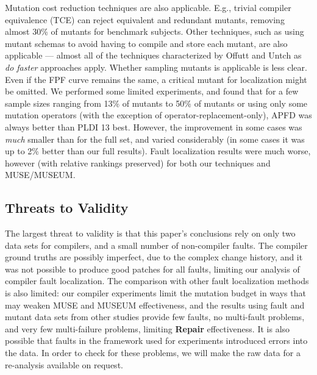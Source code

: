 Mutation cost reduction techniques are also applicable.  E.g., trivial compiler equivalence (TCE) \cite{TCE} can reject equivalent and redundant mutants, removing almost 30\% of mutants for benchmark subjects. Other techniques, such as using mutant schemas to avoid having to compile and store each mutant, are also applicable --- almost all of the techniques characterized by Offutt and Untch \cite{offutt2001mutation} as \emph{do faster} approaches apply.   Whether sampling mutants \cite{RahulISSRE} is applicable is less clear.  Even if the FPF curve remains the same, a critical mutant for localization might be omitted.  We performed some limited experiments, and found that for a few sample sizes ranging from 13\% of mutants to 50\% of mutants or using only some mutation operators (with the exception of operator-replacement-only), APFD was always better than PLDI 13 best.   However, the improvement in some cases was \emph{much} smaller than for the full set, and varied considerably (in some cases it was up to 2\% better than our full results).  Fault localization results were much worse, however (with relative rankings preserved) for both our techniques and MUSE/MUSEUM.  

\subsection{Threats to Validity}

The largest threat to validity is that this paper's conclusions rely on only two data sets for compilers, and a small number of non-compiler faults.  The compiler ground truths are possibly imperfect, due to the complex change history, and it was not possible to produce good patches for all faults, limiting our analysis of compiler fault localization.    The comparison with other fault localization methods is also limited:  our compiler experiments limit the mutation budget in ways that may weaken MUSE and MUSEUM effectiveness, and the results using fault and mutant data sets from other studies provide few faults, no multi-fault problems, and very few multi-failure problems, limiting {\bf Repair} effectiveness.   It is also possible that faults in the framework used for experiments introduced errors into the data.  In order to check for these problems, we will make the raw data for a re-analysis available on request.  
